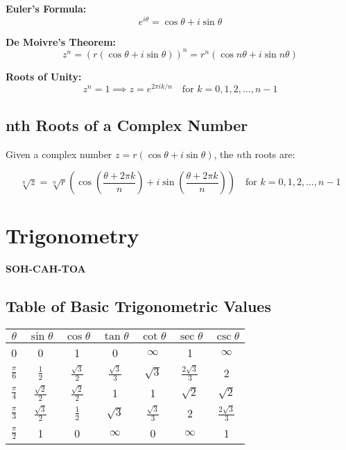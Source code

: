 \documentclass[12pt]{article}
\begin{document}
\textbf{Euler's Formula:}
\begin{equation}
  e^{i\theta} = \cos \theta + i \sin \theta
\end{equation}

\textbf{De Moivre's Theorem:}
\begin{equation}
  z^n = (r(\cos \theta + i \sin \theta))^n = r^n (\cos n\theta + i \sin n\theta)
\end{equation}

\textbf{Roots of Unity:}
\begin{equation}
  z^n = 1 \implies z = e^{2\pi i k / n} \quad \text{for } k = 0, 1, 2, \ldots, n-1
\end{equation}

\subsection*{nth Roots of a Complex Number}

Given a complex number $z = r(\cos \theta + i \sin \theta)$, the $n$th roots are:

\begin{equation}
  \sqrt[n]{z} = \sqrt[n]{r} \left( \cos \left( \frac{\theta + 2\pi k}{n} \right) + i \sin \left( \frac{\theta + 2\pi k}{n} \right) \right) \quad \text{for } k = 0, 1, 2, \ldots, n-1
\end{equation}


\section{Trigonometry}

\textbf{SOH-CAH-TOA}

\subsection*{Table of Basic Trigonometric Values}


\begin{table}[h]
  \centering
  \renewcommand{\arraystretch}{2}
\begin{tabular}{|c|c|c|c|c|c|c|}
  \hline
  $\theta$ & $\sin \theta$ & $\cos \theta$ & $\tan \theta$ & $\cot \theta$ & $\sec \theta$ & $\csc \theta$ \\
  \hline
  0 & 0 & 1 & 0 & $\infty$ & 1 & $\infty$ \\
  $\frac{\pi}{6}$ & $\frac{1}{2}$ & $\frac{\sqrt{3}}{2}$ & $\frac{\sqrt{3}}{3}$ & $\sqrt{3}$ & $\frac{2\sqrt{3}}{3}$ & 2 \\
  $\frac{\pi}{4}$ & $\frac{\sqrt{2}}{2}$ & $\frac{\sqrt{2}}{2}$ & 1 & 1 & $\sqrt{2}$ & $\sqrt{2}$ \\
  $\frac{\pi}{3}$ & $\frac{\sqrt{3}}{2}$ & $\frac{1}{2}$ & $\sqrt{3}$ & $\frac{\sqrt{3}}{3}$ & 2 & $\frac{2\sqrt{3}}{3}$ \\
  $\frac{\pi}{2}$ & 1 & 0 & $\infty$ & 0 & $\infty$ & 1 \\
  \hline
\end{tabular}
\end{table}
\end{document}
